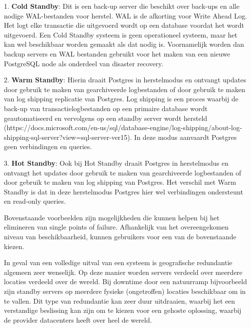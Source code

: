 1. \textbf{Cold Standby}: Dit is een back-up server die beschikt over back-ups en alle nodige WAL-bestanden voor herstel. WAL is de afkorting voor Write Ahead Log. Het logt elke transactie die uitgevoerd wordt op een database voordat het wordt uitgevoerd. Een Cold Standby systeem is geen operationeel systeem, maar het kan wel beschikbaar worden gemaakt als dat nodig is. Voornamelijk worden dan backup servers en WAL bestanden gebruikt voor het maken van een nieuwe PostgreSQL node als onderdeel van disaster recovery.

2. \textbf{Warm Standby}: Hierin draait Postgres in herstelmodus en ontvangt updates door gebruik te maken van gearchiveerde logbestanden of door gebruik te maken van log shipping replicatie van Postgres. Log shipping is een proces waarbij de back-up van transactielogbestanden op een primaire database wordt geautomatiseerd en vervolgens op een standby server wordt hersteld (https://docs.microsoft.com/en-us/sql/database-engine/log-shipping/about-log-shipping-sql-server?view=sql-server-ver15). In deze modus aanvaardt Postgres geen verbindingen en queries.

3. \textbf{Hot Standby}: Ook bij Hot Standby draait Postgres in herstelmodus en ontvangt het updates door gebruik te maken van gearchiveerde logbestanden of door gebruik te maken van log shipping van Postgres. Het verschil met Warm Standby is dat in deze herstelmodus Postgres hier wel verbindingen ondersteunt en read-only queries.

Bovenstaande voorbeelden zijn mogelijkheden die kunnen helpen bij het elimineren van single points of failure. Afhankelijk van het overeengekomen niveau van beschikbaarheid, kunnen gebruikers voor een van de bovenstaande kiezen.

In geval van een volledige uitval van een systeem is geografische redundantie algemeen zeer wenselijk. Op deze manier worden servers verdeeld over meerdere locaties verdeeld over de wereld. Bij downtime door een natuurramp bijvoorbeeld zijn standby servers op meerdere fysieke (ongetroffen) locaties beschikbaar om in te vallen. Dit type van redundantie kan zeer duur uitdraaien, waarbij het een verstandige beslissing kan zijn om te kiezen voor een gehoste oplossing, waarbij de provider datacenters heeft over heel de wereld.

\subsection{}
\label{subsec:Load Balancing}

